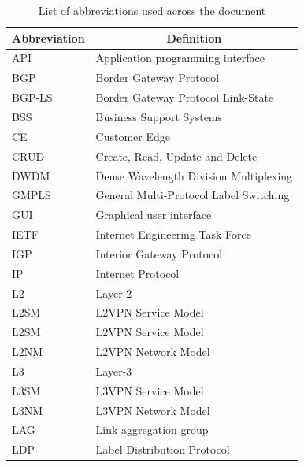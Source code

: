 \documentclass[10pt, conference]{IEEEtran}
\begin{document}
\begin{table}[htb!]
\caption{List of abbreviations used across the document}
\label{tab:abbreviations}
\begin{tabular}{|l|l|}
\hline
Abbreviation & \multicolumn{1}{c|}{Definition}              \\ \hline
API          & Application programming interface            \\ \hline
BGP          & Border Gateway Protocol                      \\ \hline
BGP-LS       & Border Gateway Protocol Link-State            \\ \hline
BSS          & Business Support Systems                     \\ \hline
CE           & Customer Edge                                \\ \hline
CRUD         & Create, Read, Update and Delete              \\ \hline
DWDM         & Dense Wavelength Division Multiplexing       \\ \hline
GMPLS        & General Multi-Protocol Label Switching       \\ \hline
GUI          & Graphical user interface                     \\ \hline
IETF         & Internet Engineering Task Force              \\ \hline
IGP          & Interior Gateway Protocol                    \\ \hline
IP           & Internet Protocol                            \\ \hline
L2           & Layer-2                                      \\ \hline
L2SM         & L2VPN Service Model                          \\ \hline
L2SM         & L2VPN Service Model                          \\ \hline
L2NM         & L2VPN Network Model                          \\ \hline
L3           & Layer-3                                      \\ \hline
L3SM         & L3VPN Service Model                          \\ \hline
L3NM         & L3VPN Network Model                          \\ \hline
LAG          & Link aggregation group                       \\ \hline
LDP          & Label Distribution Protocol                  \\ \hline

\end{tabular}
\end{table}
\end{document}
